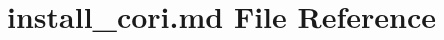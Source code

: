 \hypertarget{install__cori_8md}{}\section{install\+\_\+cori.\+md File Reference}
\label{install__cori_8md}

